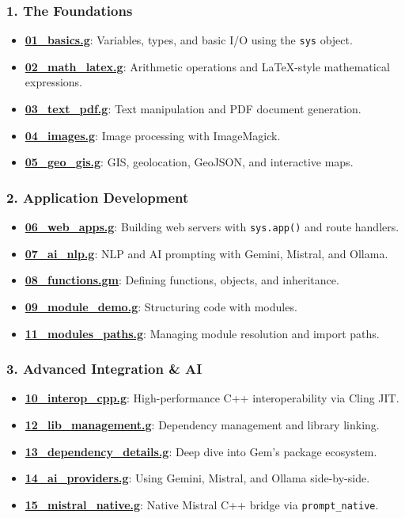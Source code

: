 \documentclass[
]{article}
\providecommand{\tightlist}{%
  \setlength{\itemsep}{0pt}\setlength{\parskip}{0pt}}
\begin{document}
\subsubsection{1. The Foundations}\label{the-foundations}

\begin{itemize}
\tightlist
\item
  \textbf{\url{01_basics.g}}: Variables, types, and basic I/O using the
  \texttt{sys} object.
\item
  \textbf{\url{02_math_latex.g}}: Arithmetic operations and LaTeX-style
  mathematical expressions.
\item
  \textbf{\url{03_text_pdf.g}}: Text manipulation and PDF document
  generation.
\item
  \textbf{\url{04_images.g}}: Image processing with ImageMagick.
\item
  \textbf{\url{05_geo_gis.g}}: GIS, geolocation, GeoJSON, and
  interactive maps.
\end{itemize}

\subsubsection{2. Application
Development}\label{application-development}

\begin{itemize}
\tightlist
\item
  \textbf{\url{06_web_apps.g}}: Building web servers with
  \texttt{sys.app()} and route handlers.
\item
  \textbf{\url{07_ai_nlp.g}}: NLP and AI prompting with Gemini, Mistral,
  and Ollama.
\item
  \textbf{\url{08_functions.gm}}: Defining functions, objects, and
  inheritance.
\item
  \textbf{\url{09_module_demo.g}}: Structuring code with modules.
\item
  \textbf{\url{11_modules_paths.g}}: Managing module resolution and
  import paths.
\end{itemize}

\subsubsection{3. Advanced Integration \&
AI}\label{advanced-integration-ai}

\begin{itemize}
\tightlist
\item
  \textbf{\url{10_interop_cpp.g}}: High-performance C++ interoperability
  via Cling JIT.
\item
  \textbf{\url{12_lib_management.g}}: Dependency management and library
  linking.
\item
  \textbf{\url{13_dependency_details.g}}: Deep dive into Gem's package
  ecosystem.
\item
  \textbf{\url{14_ai_providers.g}}: Using Gemini, Mistral, and Ollama
  side-by-side.
\item
  \textbf{\url{15_mistral_native.g}}: Native Mistral C++ bridge via
  \texttt{prompt\_native}.
\end{itemize}
\end{document}
